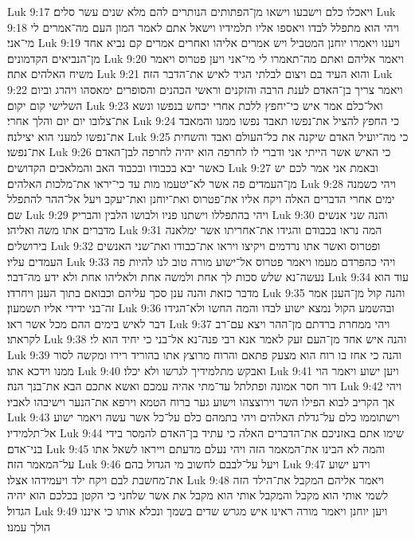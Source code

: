 Luk 9:17  ויאכלו כלם וישבעו וישאו מן־הפתותים הנותרים להם מלא שנים עשר סלים׃
Luk 9:18  ויהי הוא מתפלל לבדו ויאספו אליו תלמידיו וישאל אתם לאמר המון העם מה־אמרים לי מי־אני׃
Luk 9:19  ויענו ויאמרו יוחנן המטביל ויש אמרים אליהו ואחרים אמרים קם נביא אחד מן־הנביאים הקדמונים׃
Luk 9:20  ויאמר אליהם ואתם מה־תאמרו לי מי־אני ויען פטרוס ויאמר משיח האלהים אתה׃
Luk 9:21  והוא העיד בם ויצום לבלתי הגיד לאיש את־הדבר הזה׃
Luk 9:22  ויאמר צריך בן־האדם לענת הרבה והזקנים וראשי הכהנים והסופרים ימאסהו ויהרג וביום השלישי קום יקום׃
Luk 9:23  ואל־כלם אמר איש כי־יחפץ ללכת אחרי יכחש בנפשו ונשא את־צלובו יום יום והלך אחרי׃
Luk 9:24  כי החפץ להציל את־נפשו תאבד נפשו ממנו והמאבד את־נפשו למעני הוא יצילנה׃
Luk 9:25  כי מה־יועיל האדם שיקנה את כל־העולם ואבד והשחית את־נפשו׃
Luk 9:26  כי האיש אשר הייתי אני ודברי לו לחרפה הוא יהיה לחרפה לבן־האדם כאשר יבא בכבודו ובכבוד האב והמלאכים הקדושים׃
Luk 9:27  ובאמת אני אמר לכם יש מן־העמדים פה אשר לא־יטעמו מות עד כי־יראו את־מלכות האלהים׃
Luk 9:28  ויהי כשמנה ימים אחרי הדברים האלה ויקח אליו את־פטרוס ואת־יוחנן ואת־יעקב ויעל אל־ההר להתפלל שם׃
Luk 9:29  ויהי בהתפללו וישתנו פניו ולבושו הלבין והבריק׃
Luk 9:30  והנה שני אנשים מדברים אתו משה ואליהו׃
Luk 9:31  המה נראו בכבודם והגידו את־אחריתו אשר ימלאנה בירושלים׃
Luk 9:32  ופטרוס ואשר אתו נרדמים ויקיצו ויראו את־כבודו ואת־שני האנשים העמדים עליו׃
Luk 9:33  ויהי כהפרדם מעמו ויאמר פטרוס אל־ישוע מורה טוב לנו להיות פה נעשה־נא שלש סכות לך אחת ולמשה אחת ולאליהו אחת ולא ידע מה־דבר׃
Luk 9:34  עוד הוא מדבר כזאת והנה ענן סכך עליהם וכבואם בתוך הענן ויחרדו׃
Luk 9:35  והנה קול מן־הענן אמר זה־בני ידידי אליו תשמעון׃
Luk 9:36  ובהשמע הקול נמצא ישוע לבדו והמה החשו ולא־הגידו דבר לאיש בימים ההם מכל אשר ראו׃
Luk 9:37  ויהי ממחרת ברדתם מן־ההר ויצא עם־רב לקראתו׃
Luk 9:38  והנה איש אחד מן־העם זעק לאמר אנא רבי פנה־נא אל־בני כי יחיד הוא לי׃
Luk 9:39  והנה כי אחז בו רוח הוא מצעק פתאם והרוח מרוצץ אתו בהוריד רירו ומקשה לסור ממנו וידכא אתו׃
Luk 9:40  ואבקש מתלמידיך לגרשו ולא יכלו׃
Luk 9:41  ויען ישוע ויאמר הוי דור חסר אמונה ופתלתל עד־מתי אהיה עמכם ואשא אתכם הבא את־בנך הנה׃
Luk 9:42  ויהי אך הקריב לבוא הפילו השד וירוצצהו וישוע גער ברוח הטמא וירפא את־הנער וישיבהו לאביו׃
Luk 9:43  וישתוממו כלם על־גדלת האלהים ויהי בתמהם כלם על־כל אשר עשה ויאמר ישוע אל־תלמידיו׃
Luk 9:44  שימו אתם באזניכם את־הדברים האלה כי עתיד בן־האדם להמסר בידי בני־אדם׃
Luk 9:45  והמה לא הבינו את־המאמר הזה ויהי נעלם מדעתם וייראו לשאל אתו על־המאמר הזה׃
Luk 9:46  ויעל על־לבבם לחשוב מי הגדול בהם׃
Luk 9:47  וידע ישוע את־מחשבת לבם ויקח ילד ויעמידהו אצלו׃
Luk 9:48  ויאמר אליהם המקבל את־הילד הזה לשמי אותי הוא מקבל והמקבל אותי הוא מקבל את אשר שלחני כי הקטן בכלכם הוא יהיה הגדול׃
Luk 9:49  ויען יוחנן ויאמר מורה ראינו איש מגרש שדים בשמך ונכלא אותו כי איננו הולך עמנו׃
